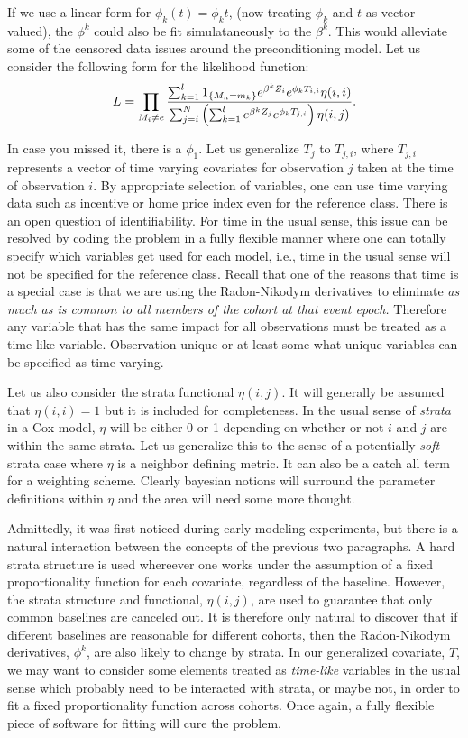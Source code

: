 \documentclass[10pt]{article}
\begin{document}
If we use a linear form for $\phi_k(t)=\phi_kt$, (now treating $\phi_k$ and $t$ as vector valued), the $\phi^k$ could also be fit simulataneously
to the $\beta^k$.  
This would alleviate some of the censored data issues around the preconditioning 
model.  Let us consider the following form for the likelihood function:
$$L=\prod_{M_i \not = e} {{  \sum_{k=1}^l1_{\{M_n=m_k\}}e^{\beta^kZ_i}e^{\phi_kT_{i,i}}\eta(i,i) }
\over { \sum_{j=i}^N \left({ \sum_{k=1}^le^{\beta^kZ_j}e^{\phi_kT_{j,i}} }\right)\eta(i,j) } }. $$

In case you missed it, there is a $\phi_1$.  Let us generalize $T_j$ to  $T_{j,i}$, where $T_{j,i}$ represents a vector of time varying 
covariates for observation $j$ taken at the time of observation $i$.  By appropriate selection of variables, one can use time varying data such 
as incentive or home price index even for the reference class.  There is 
an open question of identifiability. For time in the usual sense, this issue can be resolved by coding the problem in a fully flexible manner where one 
can totally specify which variables get used for each model, i.e., time in the usual sense will not be specified for the reference class.
Recall that one of the reasons that time is a special case is that we are using the Radon-Nikodym derivatives to eliminate {\em as much as is common 
to all members of the cohort at that event epoch.}  Therefore any variable that has the same impact for all observations must be 
treated as a time-like variable.  Observation unique or at least some-what unique variables can be specified as time-varying.


Let us also consider the strata functional $\eta(i,j)$.  It will generally be assumed that $\eta(i,i)=1$ but it is included for completeness.
In the usual sense of {\em strata} in a Cox model, $\eta$ will be either 0 or 1 depending on whether or not $i$ and $j$ are within the same strata.
Let us generalize this to the sense of a potentially {\em soft} strata case where $\eta$ is a neighbor defining metric.  It can also be a catch all
term for a weighting scheme.  Clearly bayesian notions will surround the parameter definitions within $\eta$ and the area will need some more 
thought.


Admittedly, it was first noticed during early modeling experiments, but there is a natural interaction between the concepts of the previous two
paragraphs.  A hard strata structure is used whereever one works under the assumption of a fixed proportionality function for each covariate, regardless 
of the baseline. However, the strata structure and functional, $\eta(i,j)$, are used to guarantee that only common baselines are canceled out. 
It is therefore only natural to discover that if different baselines are reasonable for different cohorts, then the Radon-Nikodym derivatives,
$\phi^k$, are also likely to change by strata.  In our generalized covariate, $T$, we may want to consider some elements treated as {\em time-like} variables 
in the usual sense which probably need to be interacted with strata, or maybe not, in order to fit a fixed proportionality function across 
cohorts.  Once again, a fully flexible piece of software for fitting will cure the problem.
\end{document}
